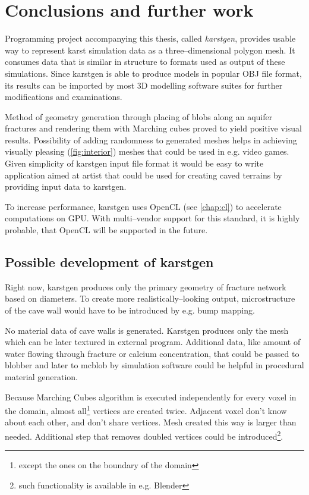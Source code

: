 \chapter{Conclusions and further work}
\label{chap:furtherwork}

Programming project accompanying this thesis, called \emph{karstgen}, provides
usable way to represent karst simulation data as a three--dimensional polygon
mesh. It consumes data that is similar in structure to formats used as output of
these simulations. Since karstgen is able to produce models in popular OBJ file
format, its results can be imported by most 3D modelling software suites for further
modifications and examinations.

Method of geometry generation through placing of blobs along an aquifer fractures
and rendering them with Marching cubes proved to yield positive visual results.
Possibility of adding randomness to generated meshes helps in achieving
visually pleasing (\autoref{fig:interior}) meshes that could be used in e.g.
video games. Given simplicity of karstgen input file format it would be easy to
write application aimed at artist that could be used for creating caved terrains
by providing input data to karstgen.

To increase performance, karstgen uses OpenCL (see \autoref{chap:cl}) to
accelerate computations on GPU. With multi--vendor support for this standard,
it is highly probable, that OpenCL will be supported in the future.

\section{Possible development of karstgen}

Right now, karstgen produces only the primary geometry of fracture network based
on diameters. To create more realistically--looking output, microstructure of
the cave wall would have to be introduced by e.g. bump mapping.

No material data of cave walls is generated. Karstgen produces only the mesh which
can be later textured in external program. Additional data, like amount of water
flowing through fracture or calcium concentration, that could be passed to blobber
and later to mcblob by simulation software could be helpful in procedural
material generation.

Because Marching Cubes algorithm is executed independently for every voxel in the
domain, almost all\footnote{except the ones on the boundary of the domain}
vertices are created twice. Adjacent voxel don't know about
each other, and don't share vertices. Mesh created this way is larger than
needed. Additional step that removes doubled vertices could be
introduced\footnote{such functionality is available in e.g. Blender}.

